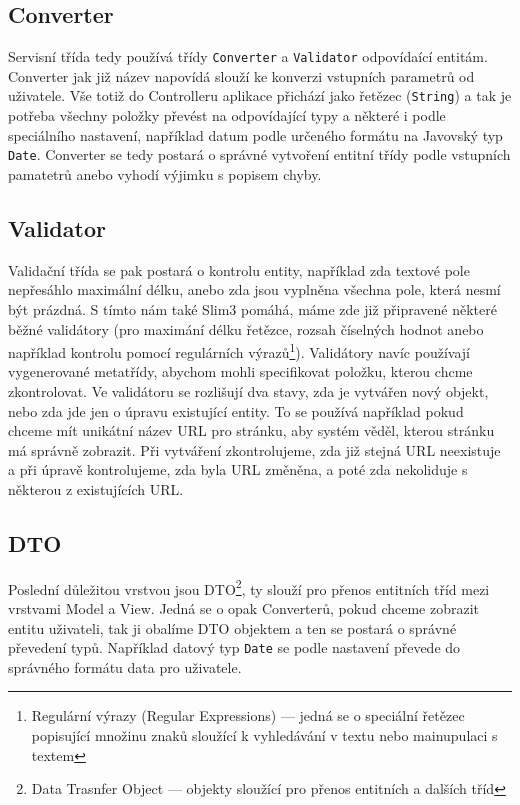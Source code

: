 \subsection{Converter}
Servisní třída tedy používá třídy \verb|Converter| a \verb|Validator| odpovídaící entitám. Converter jak již název napovídá slouží ke konverzi vstupních parametrů od uživatele. Vše totiž do Controlleru aplikace přichází jako řetězec (\verb|String|) a tak je potřeba všechny položky převést na odpovídající typy a některé i podle speciálního nastavení, například datum podle určeného formátu na Javovský typ \verb|Date|. Converter se tedy postará o správné vytvoření entitní třídy podle vstupních pamatetrů anebo vyhodí výjimku s popisem chyby. 

\subsection{Validator}
Validační třída se pak postará o kontrolu entity, například zda textové pole nepřesáhlo maximální délku, anebo zda jsou vyplněna všechna pole, která nesmí být prázdná. S tímto nám také Slim3 pomáhá, máme zde již připravené některé běžné validátory (pro maximání délku řetězce, rozsah číselných hodnot anebo například kontrolu pomocí regulárních výrazů\footnote{Regulární výrazy (Regular Expressions) --- jedná se o speciální řetězec popisující množinu znaků sloužící k vyhledávání v textu nebo mainupulaci s textem}). Validátory navíc používají vygenerované metatřídy, abychom mohli specifikovat položku, kterou chcme zkontrolovat. Ve validátoru se rozlišují dva stavy, zda je vytvářen nový objekt, nebo zda jde jen o úpravu existující entity. To se používá například pokud chceme mít unikátní název URL pro stránku, aby systém věděl, kterou stránku má správně zobrazit. Při vytváření zkontrolujeme, zda již stejná URL neexistuje a při úpravě kontrolujeme, zda byla URL změněna, a poté zda nekoliduje s některou z existujících URL. 

\subsection{DTO}
Poslední důležitou vrstvou jsou DTO\footnote{Data Trasnfer Object --- objekty sloužící pro přenos entitních a dalších tříd}, ty slouží pro přenos entitních tříd mezi vrstvami Model a View. Jedná se o opak Converterů, pokud chceme zobrazit entitu uživateli, tak ji obalíme DTO objektem a ten se postará o správné převedení typů. Například datový typ \verb|Date| se podle nastavení převede do správného formátu data pro uživatele. 

